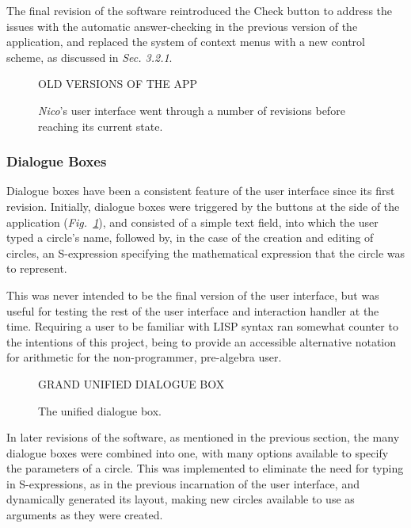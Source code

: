 \documentclass[12pt,twoside,notitlepage,xetex]{report}
\begin{document}
The final revision of the software reintroduced the {\sfapp Check} button to address the issues with the automatic answer-checking in the previous version of the application, and replaced the system of context menus with a new control scheme, as discussed in \emph{Sec. 3.2.1}.

\begin{center}
\begin{figure}[H]
\begin{center}
{\Huge \sfapp OLD VERSIONS OF THE APP}
\end{center}
\caption{\emph{Nico}'s user interface went through a number of revisions before reaching its current state.}
\label{fig:OldApps}
\end{figure}
\end{center}

\subsubsection{Dialogue Boxes}

Dialogue boxes have been a consistent feature of the user interface since its first revision.  Initially, dialogue boxes were triggered by the buttons at the side of the application (\emph{Fig.~\ref{fig:OldApps}}), and consisted of a simple text field, into which the user typed a circle's name, followed by, in the case of the creation and editing of circles, an S-expression specifying the mathematical expression that the circle was to represent.

This was never intended to be the final version of the user interface, but was useful for testing the rest of the user interface and interaction handler at the time.  Requiring a user to be familiar with LISP syntax ran somewhat counter to the intentions of this project, being to provide an accessible alternative notation for arithmetic for the non-programmer, pre-algebra user.

\begin{center}
\begin{figure}[H]
\begin{center}
{\Huge \sfapp GRAND UNIFIED DIALOGUE BOX}
\end{center}
\caption{The unified dialogue box.}
\label{fig:GUDB}
\end{figure}
\end{center}

In later revisions of the software, as mentioned in the previous section, the many dialogue boxes were combined into one, with many options available to specify the parameters of a circle.  This was implemented to eliminate the need for typing in S-expressions, as in the previous incarnation of the user interface, and dynamically generated its layout, making new circles available to use as arguments as they were created.
\end{document}
